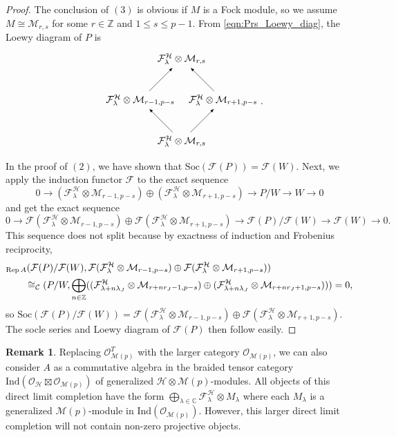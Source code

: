 \documentclass[11pt, reqno]{amsart}
\theoremstyle{definition}\newtheorem{defi}[thm]{Definition}
\theoremstyle{definition}\newtheorem{rem}[thm]{Remark}
\theoremstyle{definition}\newtheorem{exam}[thm]{Example}
\theoremstyle{definition}\newtheorem{assum}[thm]{Assumption}
\newcommand{\cH}{\mathcal{H}}
\newcommand{\cM}{\mathcal{M}}
\newcommand{\cF}{\mathcal{F}}
\newcommand{\cO}{\mathcal{O}}
\newcommand{\cC}{\mathcal{C}}
\newcommand{\CC}{\mathbb{C}}
\newcommand{\ZZ}{\mathbb{Z}}
\newcommand{\tens}{\boxtimes}
\newcommand{\ind}{\mathrm{Ind}}
\DeclareMathOperator{\rep}{Rep}
\let\hom\relax
\DeclareMathOperator{\hom}{Hom}
\newcommand{\repA}{\rep A}
\begin{document}
\begin{proof}
The conclusion of $(3)$ is obvious if $M$ is a Fock module, so we assume $M \cong \cM_{r,s}$ for some $r \in \ZZ$ and $1 \leq s \leq p-1$. From \eqref{eqn:Prs_Loewy_diag}, the Loewy diagram of $P$ is
\begin{equation*}
 \begin{matrix}
  \begin{tikzpicture}[->,>=latex,scale=1.5]
\node (b1) at (1,0) {$\cF_{\lambda}^{\cH} \otimes \cM_{r,s}$};
\node (c1) at (-1, 1){};
   \node (a1) at (0,1) {$\cF_{\lambda}^{\cH} \otimes \cM_{r-1,p-s}$};
   \node (b2) at (2,1) {$\cF_{\lambda}^{\cH} \otimes \cM_{r+1,p-s}$};
    \node (a2) at (1,2) {$\cF_{\lambda}^{\cH} \otimes \cM_{r,s}$};
\draw[] (b1) -- node[left] {} (a1);
   \draw[] (b1) -- node[left] {} (b2);
    \draw[] (a1) -- node[left] {} (a2);
    \draw[] (b2) -- node[left] {} (a2);
\end{tikzpicture}
\end{matrix} .
 \end{equation*}
 In the proof of $(2)$, we have shown that $\mathrm{Soc}(\cF(P)) = \cF(W)$. Next, we apply the induction functor $\cF$ to the exact sequence
 \[
 0 \longrightarrow (\cF_{\lambda}^{\cH} \otimes \cM_{r-1,p-s}) \oplus (\cF_{\lambda}^{\cH} \otimes \cM_{r+1,p-s} ) \longrightarrow P/W \longrightarrow W \longrightarrow 0
 \]
 and get the exact sequence
 \[
 0 \longrightarrow \cF(\cF_{\lambda}^{\cH} \otimes \cM_{r-1,p-s}) \oplus \cF(\cF_{\lambda}^{\cH} \otimes \cM_{r+1,p-s} ) \longrightarrow \cF(P)/\cF(W) \longrightarrow \cF(W) \longrightarrow 0.
 \]
 This sequence does not split because by exactness of induction and Frobenius reciprocity,
 \begin{align*}
 &\hom_{\repA}(\cF(P)/\cF(W), \cF(\cF_{\lambda}^{\cH} \otimes \cM_{r-1,p-s}) \oplus \cF(\cF_{\lambda}^{\cH} \otimes \cM_{r+1,p-s} ) ) \\
 &\qquad \cong \hom_{\cC}(P/W, \bigoplus_{n \in \ZZ}((\cF_{\lambda + n\lambda_J}^{\cH} \otimes \cM_{r+nr_J-1,p-s}) \oplus (\cF_{\lambda + n\lambda_J}^{\cH} \otimes \cM_{r+nr_J+1,p-s}))) = 0,
 \end{align*}
so $\mathrm{Soc}(\cF(P)/\cF(W)) = \cF(\cF_{\lambda}^{\cH} \otimes \cM_{r-1,p-s}) \oplus \cF(\cF_{\lambda}^{\cH} \otimes \cM_{r+1,p-s} )$. The socle series and Loewy diagram of $\cF(P)$ then follow easily.
\end{proof}

\begin{rem}
Replacing $\cO_{\cM(p)}^T$ with the larger category $\cO_{\cM(p)}$, we can also consider $A$ as a commutative algebra in the braided tensor category $\ind(\cO_\cH\tens\cO_{\cM(p)})$ of generalized $\cH\otimes\cM(p)$-modules. All objects of this direct limit completion have the form $\bigoplus_{\lambda\in\CC} \cF^\cH_\lambda\otimes M_\lambda$ where each $M_\lambda$ is a generalized $\cM(p)$-module in $\ind(\cO_{\cM(p)})$. However, this larger direct limit completion will not contain non-zero projective objects.
\end{rem}
\end{document}
